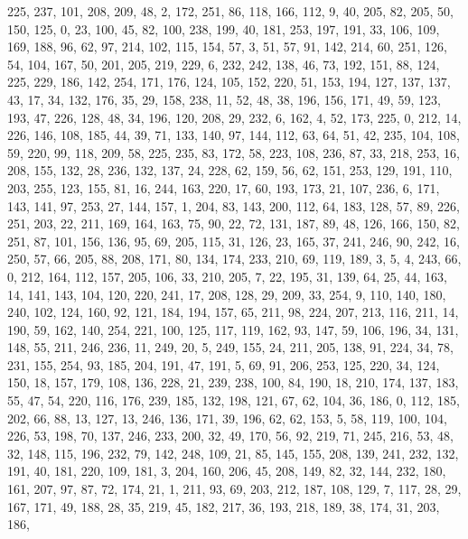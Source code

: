 \begin{DoxyCode}
       225, 237, 101, 208, 209, 48, 2, 172, 251, 86, 118, 166, 112, 9, 40, 205, 82, 205, 50, 150, 125, 0, 23, 100,
       45, 82, 100, 238, 199, 40, 181, 253, 197, 191, 33, 106, 109, 169, 188, 96, 62, 97, 214, 102, 115, 154, 57, 3,
       51, 57, 91, 142, 214, 60, 251, 126, 54, 104, 167, 50, 201, 205, 219, 229, 6, 232, 242, 138, 46, 73, 192,
       151, 88, 124, 225, 229, 186, 142, 254, 171, 176, 124, 105, 152, 220, 51, 153, 194, 127, 137, 137, 43, 17, 34,
       132, 176, 35, 29, 158, 238, 11, 52, 48, 38, 196, 156, 171, 49, 59, 123, 193, 47, 226, 128, 48, 34, 196, 120,
       208, 29, 232, 6, 162, 4, 52, 173, 225, 0, 212, 14, 226, 146, 108, 185, 44, 39, 71, 133, 140, 97, 144, 112,
       63, 64, 51, 42, 235, 104, 108, 59, 220, 99, 118, 209, 58, 225, 235, 83, 172, 58, 223, 108, 236, 87, 33, 218,
       253, 16, 208, 155, 132, 28, 236, 132, 137, 24, 228, 62, 159, 56, 62, 151, 253, 129, 191, 110, 203, 255, 123,
       155, 81, 16, 244, 163, 220, 17, 60, 193, 173, 21, 107, 236, 6, 171, 143, 141, 97, 253, 27, 144, 157, 1,
       204, 83, 143, 200, 112, 64, 183, 128, 57, 89, 226, 251, 203, 22, 211, 169, 164, 163, 75, 90, 22, 72, 131, 187,
       89, 48, 126, 166, 150, 82, 251, 87, 101, 156, 136, 95, 69, 205, 115, 31, 126, 23, 165, 37, 241, 246, 90,
       242, 16, 250, 57, 66, 205, 88, 208, 171, 80, 134, 174, 233, 210, 69, 119, 189, 3, 5, 4, 243, 66, 0, 212, 164,
       112, 157, 205, 106, 33, 210, 205, 7, 22, 195, 31, 139, 64, 25, 44, 163, 14, 141, 143, 104, 120, 220, 241, 17,
       208, 128, 29, 209, 33, 254, 9, 110, 140, 180, 240, 102, 124, 160, 92, 121, 184, 194, 157, 65, 211, 98, 224,
       207, 213, 116, 211, 14, 190, 59, 162, 140, 254, 221, 100, 125, 117, 119, 162, 93, 147, 59, 106, 196, 34,
       131, 148, 55, 211, 246, 236, 11, 249, 20, 5, 249, 155, 24, 211, 205, 138, 91, 224, 34, 78, 231, 155, 254, 93,
       185, 204, 191, 47, 191, 5, 69, 91, 206, 253, 125, 220, 34, 124, 150, 18, 157, 179, 108, 136, 228, 21, 239,
       238, 100, 84, 190, 18, 210, 174, 137, 183, 55, 47, 54, 220, 116, 176, 239, 185, 132, 198, 121, 67, 62, 104,
       36, 186, 0, 112, 185, 202, 66, 88, 13, 127, 13, 246, 136, 171, 39, 196, 62, 62, 153, 5, 58, 119, 100, 104,
       226, 53, 198, 70, 137, 246, 233, 200, 32, 49, 170, 56, 92, 219, 71, 245, 216, 53, 48, 32, 148, 115, 196, 232,
       79, 142, 248, 109, 21, 85, 145, 155, 208, 139, 241, 232, 132, 191, 40, 181, 220, 109, 181, 3, 204, 160, 206,
       45, 208, 149, 82, 32, 144, 232, 180, 161, 207, 97, 87, 72, 174, 21, 1, 211, 93, 69, 203, 212, 187, 108,
       129, 7, 117, 28, 29, 167, 171, 49, 188, 28, 35, 219, 45, 182, 217, 36, 193, 218, 189, 38, 174, 31, 203, 186,

\end{DoxyCode}
